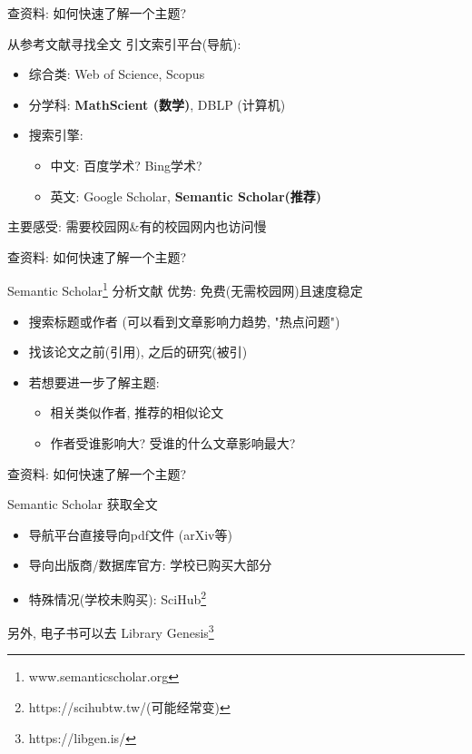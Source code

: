 \documentclass[UTF8]{ctexbeamer}
\begin{document}
\begin{frame}{查资料: 如何快速了解一个主题?}
\begin{alertblock}{从参考文献寻找全文}
引文索引平台(导航):
    \begin{itemize}
        \item 综合类: Web of Science, Scopus 
        \item 分学科: \textbf{MathScient (数学)}, DBLP (计算机)
        \item 搜索引擎: 
        \begin{itemize}
            \item 中文: 百度学术? Bing学术?
            \item 英文: Google Scholar, \textbf{Semantic Scholar(推荐)}
        \end{itemize}
    \end{itemize}
\end{alertblock}
\begin{alertblock}{主要感受: 需要校园网\&有的校园网内也访问慢}
\end{alertblock}
\end{frame}

\begin{frame}{查资料: 如何快速了解一个主题?}
\begin{alertblock}{Semantic Scholar\footnote{www.semanticscholar.org} 分析文献}
优势: 免费(无需校园网)且速度稳定
    \begin{itemize}
        \item 搜索标题或作者 (可以看到文章影响力趋势, "热点问题")
        \item 找该论文之前(引用), 之后的研究(被引)
        \item 若想要进一步了解主题:
        \begin{itemize}
            \item 相关类似作者, 推荐的相似论文
            \item 作者受谁影响大? 受谁的什么文章影响最大?
        \end{itemize}
    \end{itemize}
\end{alertblock}
\end{frame}

\begin{frame}{查资料: 如何快速了解一个主题?}
\begin{alertblock}{Semantic Scholar 获取全文}
    \begin{itemize}
        \item 导航平台直接导向pdf文件 (arXiv等)
        \item 导向出版商/数据库官方: 学校已购买大部分
        \item 特殊情况(学校未购买): SciHub\footnote{https://scihubtw.tw/(可能经常变)}
    \end{itemize}
\end{alertblock}
另外, 电子书可以去 Library Genesis\footnote{https://libgen.is/}
\end{frame}
\end{document}
